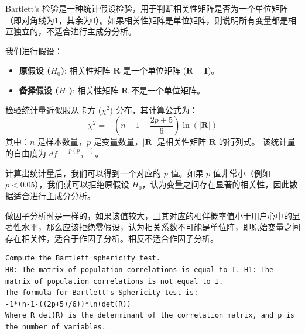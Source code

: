 \begin{definition}
    Bartlett's 检验是一种统计假设检验，用于判断相关性矩阵是否为一个单位矩阵（即对角线为1，其余为0）。如果相关性矩阵是单位矩阵，则说明所有变量都是相互独立的，不适合进行主成分分析。

    我们进行假设：
    \begin{itemize}
        \item \textbf{原假设 ($H_0$)}: 相关性矩阵 $\mathbf{R}$ 是一个单位矩阵 ($\mathbf{R} = \mathbf{I}$)。
        \item \textbf{备择假设 ($H_1$)}: 相关性矩阵 $\mathbf{R}$ 不是一个单位矩阵。
    \end{itemize}

    检验统计量近似服从卡方 ($\chi^2$) 分布，其计算公式为：
    \begin{equation}
        \chi^2 = -\left(n - 1 - \frac{2p + 5}{6}\right) \ln(|\mathbf{R}|)
    \end{equation}
    其中：$n$ 是样本数量，$p$ 是变量数量，$|\mathbf{R}|$ 是相关性矩阵 $\mathbf{R}$ 的行列式。
    该统计量的自由度为 $df = \frac{p(p-1)}{2}$。

    计算出统计量后，我们可以得到一个对应的 $p$ 值。如果 $p$ 值非常小（例如 $p < 0.05$），我们就可以拒绝原假设 $H_0$，认为变量之间存在显著的相关性，因此数据适合进行主成分分析。

    \begin{tips}
        做因子分析时是一样的，如果该值较大，且其对应的相伴概率值小于用户心中的显著性水平，那么应该拒绝零假设，认为相关系数不可能是单位阵，即原始变量之间存在相关性，适合于作因子分析。相反不适合作因子分析。
    \end{tips}
\end{definition}

\begin{lstlisting}[style=python]
Compute the Bartlett sphericity test.
H0: The matrix of population correlations is equal to I. H1: The matrix of population correlations is not equal to I.
The formula for Bartlett's Sphericity test is:
-1*(n-1-((2p+5)/6))*ln(det(R))
Where R det(R) is the determinant of the correlation matrix, and p is the number of variables.
\end{lstlisting}

